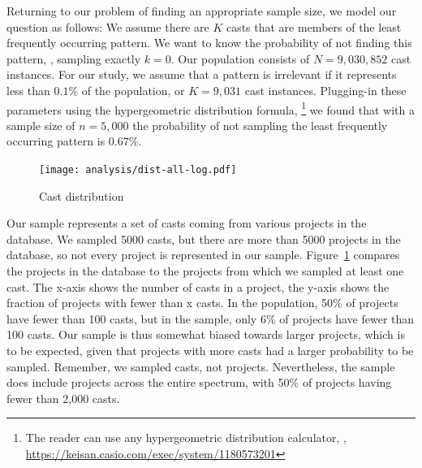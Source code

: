 Returning to our problem of finding an appropriate sample size, we model our question as follows:
We assume there are $K$ casts that are members of the least frequently occurring pattern.
We want to know the probability of not finding this pattern, \ie, sampling exactly $k = 0$.
Our population consists of $N = 9,030,852$ cast instances.
For our study, we assume that a pattern is irrelevant if it represents less than $0.1\%$ of the population, or $K = 9,031$ cast instances.
Plugging-in these parameters using the hypergeometric distribution formula,%
\footnote{The reader can use any hypergeometric distribution calculator, \eg{}, \url{https://keisan.casio.com/exec/system/1180573201}}
we found that with a sample size of $n = 5,000$ the probability of not sampling the
least frequently occurring pattern is $0.67\%$.

\begin{figure}[ht!]
  \texttt{[image: analysis/dist-all-log.pdf]}
  \caption{Cast distribution}
  \label{fig:dist}
\end{figure}

Our sample represents a set of casts coming from various projects in the database.
We sampled 5000 casts, but there are more than 5000 projects in the database,
so not every project is represented in our sample.
Figure~\ref{fig:dist} compares the projects in the database
to the projects from which we sampled at least one cast.
The x-axis shows the number of casts in a project,
the y-axis shows the fraction of projects with fewer than x casts.
In the population, 50\% of projects have fewer than 100 casts,
but in the sample, only 6\% of projects have fewer than 100 casts.
Our sample is thus somewhat biased towards larger projects,
which is to be expected, given that projects with more casts
had a larger probability to be sampled.
Remember, we sampled casts, not projects.
Nevertheless, the sample does include projects across the entire spectrum,
with 50\% of projects having fewer than 2,000 casts.

